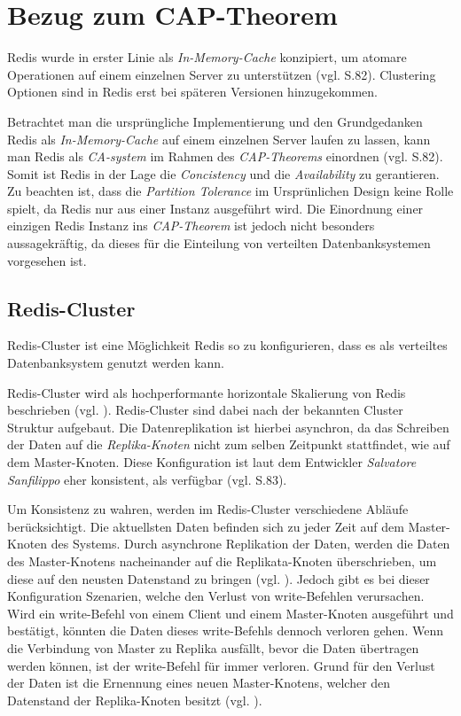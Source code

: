 
\section{Bezug zum CAP-Theorem}
\acs{Redis} wurde in erster Linie als \textit{In-Memory-Cache} konzipiert, um atomare Operationen auf einem einzelnen Server zu unterstützen (vgl. \cite{nosql} S.82).
Clustering Optionen sind in \acs{Redis} erst bei späteren Versionen hinzugekommen.

Betrachtet man die ursprüngliche Implementierung und den Grundgedanken \acs{Redis} als \textit{In-Memory-Cache} auf einem einzelnen Server laufen zu lassen, kann man \acs{Redis} als \textit{CA-system} im Rahmen des \textit{\ac{CAP}-Theorems} einordnen (vgl. \cite{nosql} S.82).
Somit ist Redis in der Lage die \textit{Concistency} und die \textit{Availability} zu gerantieren. Zu beachten ist, dass die \textit{Partition Tolerance} im Ursprünlichen Design keine Rolle spielt, da \acs{Redis} nur aus einer Instanz ausgeführt wird. 
Die Einordnung einer einzigen \acs{Redis} Instanz ins \textit{\acs{CAP}-Theorem} ist jedoch nicht besonders aussagekräftig, da dieses für die Einteilung von verteilten Datenbanksystemen vorgesehen ist.

\subsection{Redis-Cluster}
\acs{Redis}-Cluster ist eine Möglichkeit \acs{Redis} so zu konfigurieren, dass es als verteiltes Datenbanksystem genutzt werden kann. 

\acs{Redis}-Cluster wird als hochperformante horizontale Skalierung von \acs{Redis} beschrieben (vgl. \cite{Redis-Cluster-Spec}). \acs{Redis}-Cluster sind dabei nach der bekannten Cluster Struktur aufgebaut. Die Datenreplikation ist hierbei asynchron, da das Schreiben der Daten auf die \textit{Replika-Knoten} nicht zum selben Zeitpunkt stattfindet, wie auf dem Master-Knoten.
\newpage
Diese Konfiguration ist laut dem Entwickler \textit{Salvatore Sanfilippo} eher konsistent, als verfügbar (vgl. \cite{nosql} S.83).

Um Konsistenz zu wahren, werden im \acs{Redis}-Cluster verschiedene Abläufe berücksichtigt. Die aktuellsten Daten befinden sich zu jeder Zeit auf dem Master-Knoten des Systems. Durch asynchrone Replikation der Daten, werden die Daten des Master-Knotens nacheinander auf die Replikata-Knoten überschrieben, um diese auf den neusten Datenstand zu bringen (vgl. \cite{Redis-Cluster-Spec}).
Jedoch gibt es bei dieser Konfiguration Szenarien, welche den Verlust von write-Befehlen verursachen.
Wird ein write-Befehl von einem Client und einem Master-Knoten ausgeführt und bestätigt, könnten die Daten dieses write-Befehls dennoch verloren gehen. Wenn die Verbindung von Master zu Replika ausfällt, bevor die Daten übertragen werden können, ist der write-Befehl für immer verloren. Grund für den Verlust der Daten ist die Ernennung eines neuen Master-Knotens, welcher den Datenstand der Replika-Knoten besitzt (vgl. \cite{Redis-Cluster-Spec}).

